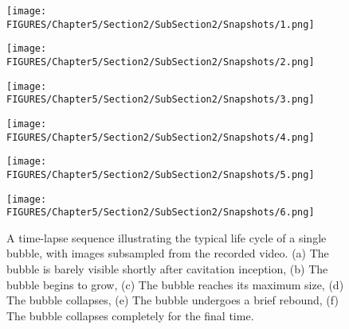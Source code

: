 \begin{figure}[h!]
    \centering
    \begin{minipage}[b]{0.48\textwidth}
        \centering
        \texttt{[image: FIGURES/Chapter5/Section2/SubSection2/Snapshots/1.png]}
    \end{minipage}
    \hfill
    \begin{minipage}[b]{0.48\textwidth}
        \centering
        \texttt{[image: FIGURES/Chapter5/Section2/SubSection2/Snapshots/2.png]}
    \end{minipage}

    \vspace{0.3cm} %

    \begin{minipage}[b]{0.48\textwidth}
        \centering
        \texttt{[image: FIGURES/Chapter5/Section2/SubSection2/Snapshots/3.png]}
    \end{minipage}
    \hfill
    \begin{minipage}[b]{0.48\textwidth}
        \centering
        \texttt{[image: FIGURES/Chapter5/Section2/SubSection2/Snapshots/4.png]}
    \end{minipage}

    \vspace{0.3cm} %

    \begin{minipage}[b]{0.48\textwidth}
        \centering
        \texttt{[image: FIGURES/Chapter5/Section2/SubSection2/Snapshots/5.png]}
    \end{minipage}
    \hfill
    \begin{minipage}[b]{0.48\textwidth}
        \centering
        \texttt{[image: FIGURES/Chapter5/Section2/SubSection2/Snapshots/6.png]}
    \end{minipage}
    \caption{A time-lapse sequence illustrating the typical life cycle of a single bubble, with images subsampled from the recorded video. (a) The bubble is barely visible shortly after cavitation inception, (b) The bubble begins to grow, (c) The bubble reaches its maximum size, (d) The bubble collapses, (e) The bubble undergoes a brief rebound, (f) The bubble collapses completely for the final time.}
    \label{fig:CavitySnapshot}
\end{figure}


